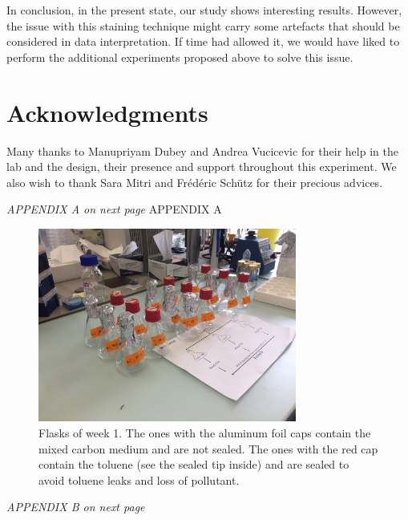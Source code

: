\documentclass[a4paper, 10pt, conference]{ieeeconf}   %
\begin{document}
In conclusion, in the present state, our study shows interesting results. However, the issue with this staining technique might carry some artefacts that should be considered in data interpretation. If time had allowed it, we would have liked to perform the additional experiments proposed above to solve this issue.
 











\section*{Acknowledgments}
Many thanks to Manupriyam Dubey and Andrea Vucicevic for their help in the lab and the design, their presence and support throughout this experiment. We also wish to thank Sara Mitri and Frédéric Schütz for their precious advices.



\printbibliography
\vspace*{\fill}
\textit{APPENDIX A on next page}
\clearpage
APPENDIX A

\begin{figure}[H]


	\includegraphics[width=8.5cm]{flasks.jpg}
	\caption{Flasks of week 1. The ones with the aluminum foil caps contain the mixed carbon medium and are not sealed. The ones with the red cap contain the toluene (see the sealed tip inside) and are sealed to avoid toluene leaks and loss of pollutant.}
	\label{flasks}
\end{figure}
\vspace*{\fill}
\textit{APPENDIX B on next page}
\clearpage
\end{document}
